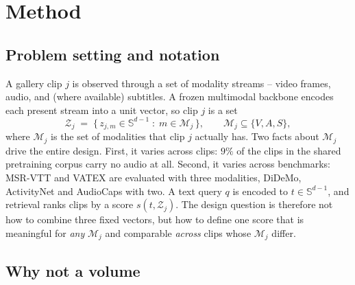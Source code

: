 
\section{Method}
\label{sec:method}

\subsection{Problem setting and notation}

A gallery clip $j$ is observed through a set of modality streams -- video frames,
audio, and (where available) subtitles. A frozen multimodal backbone encodes each
present stream into a unit vector, so clip $j$ is a set
\begin{equation}
  \mathcal{Z}_j \;=\; \{\, z_{j,m} \in \mathbb{S}^{d-1} \;:\; m \in \mathcal{M}_j \,\},
  \qquad \mathcal{M}_j \subseteq \{V, A, S\},
  \label{eq:clip}
\end{equation}
where $\mathcal{M}_j$ is the set of modalities that clip $j$ actually has. Two facts
about $\mathcal{M}_j$ drive the entire design. First, it varies across clips: $9\%$
of the clips in the shared pretraining corpus carry no audio at all. Second, it
varies across benchmarks: MSR-VTT and VATEX are evaluated with three modalities,
DiDeMo, ActivityNet and AudioCaps with two. A text query $q$ is encoded to
$t \in \mathbb{S}^{d-1}$, and retrieval ranks clips by a score $s(t, \mathcal{Z}_j)$.
The design question is therefore not how to combine three fixed vectors, but how to
define one score that is meaningful for \emph{any} $\mathcal{M}_j$ and comparable
\emph{across} clips whose $\mathcal{M}_j$ differ.

\subsection{Why not a volume}
\label{sec:why-not-volume}

